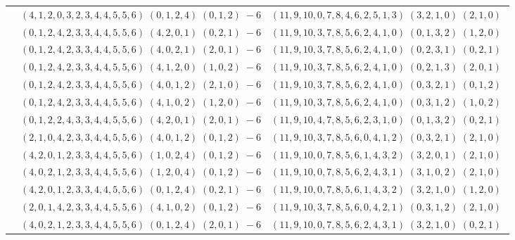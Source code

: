 \documentclass[11pt]{article}
\begin{document}
\begin{longtable}[l]{|c|c|c|}
 \cline{2-3} 
 & $(4 ,1 ,2 ,0 ,3 ,2 ,3 ,4 ,4 ,5 ,5 ,6) \;(0 ,1 ,2 ,4) \;(0 ,1 ,2) \;-6$ & $(11 ,9 ,10 ,0 ,7 ,8 ,4 ,6 ,2 ,5 ,1 ,3) \;(3 ,2 ,1 ,0) \;(2 ,1 ,0) \;$\\ 
 \cline{2-3} 
 & $(0 ,1 ,2 ,4 ,2 ,3 ,3 ,4 ,4 ,5 ,5 ,6) \;(4 ,2 ,0 ,1) \;(0 ,2 ,1) \;-6$ & $(11 ,9 ,10 ,3 ,7 ,8 ,5 ,6 ,2 ,4 ,1 ,0) \;(0 ,1 ,3 ,2) \;(1 ,2 ,0) \;$\\ 
 \cline{2-3} 
 & $(0 ,1 ,2 ,4 ,2 ,3 ,3 ,4 ,4 ,5 ,5 ,6) \;(4 ,0 ,2 ,1) \;(2 ,0 ,1) \;-6$ & $(11 ,9 ,10 ,3 ,7 ,8 ,5 ,6 ,2 ,4 ,1 ,0) \;(0 ,2 ,3 ,1) \;(0 ,2 ,1) \;$\\ 
 \cline{2-3} 
 & $(0 ,1 ,2 ,4 ,2 ,3 ,3 ,4 ,4 ,5 ,5 ,6) \;(4 ,1 ,2 ,0) \;(1 ,0 ,2) \;-6$ & $(11 ,9 ,10 ,3 ,7 ,8 ,5 ,6 ,2 ,4 ,1 ,0) \;(0 ,2 ,1 ,3) \;(2 ,0 ,1) \;$\\ 
 \cline{2-3} 
 & $(0 ,1 ,2 ,4 ,2 ,3 ,3 ,4 ,4 ,5 ,5 ,6) \;(4 ,0 ,1 ,2) \;(2 ,1 ,0) \;-6$ & $(11 ,9 ,10 ,3 ,7 ,8 ,5 ,6 ,2 ,4 ,1 ,0) \;(0 ,3 ,2 ,1) \;(0 ,1 ,2) \;$\\ 
 \cline{2-3} 
 & $(0 ,1 ,2 ,4 ,2 ,3 ,3 ,4 ,4 ,5 ,5 ,6) \;(4 ,1 ,0 ,2) \;(1 ,2 ,0) \;-6$ & $(11 ,9 ,10 ,3 ,7 ,8 ,5 ,6 ,2 ,4 ,1 ,0) \;(0 ,3 ,1 ,2) \;(1 ,0 ,2) \;$\\ 
 \cline{2-3} 
 & $(0 ,1 ,2 ,2 ,4 ,3 ,3 ,4 ,4 ,5 ,5 ,6) \;(4 ,2 ,0 ,1) \;(2 ,0 ,1) \;-6$ & $(11 ,9 ,10 ,4 ,7 ,8 ,5 ,6 ,2 ,3 ,1 ,0) \;(0 ,1 ,3 ,2) \;(0 ,2 ,1) \;$\\ 
 \cline{2-3} 
 & $(2 ,1 ,0 ,4 ,2 ,3 ,3 ,4 ,4 ,5 ,5 ,6) \;(4 ,0 ,1 ,2) \;(0 ,1 ,2) \;-6$ & $(11 ,9 ,10 ,3 ,7 ,8 ,5 ,6 ,0 ,4 ,1 ,2) \;(0 ,3 ,2 ,1) \;(2 ,1 ,0) \;$\\ 
 \cline{2-3} 
 & $(4 ,2 ,0 ,1 ,2 ,3 ,3 ,4 ,4 ,5 ,5 ,6) \;(1 ,0 ,2 ,4) \;(0 ,1 ,2) \;-6$ & $(11 ,9 ,10 ,0 ,7 ,8 ,5 ,6 ,1 ,4 ,3 ,2) \;(3 ,2 ,0 ,1) \;(2 ,1 ,0) \;$\\ 
 \cline{2-3} 
 & $(4 ,0 ,2 ,1 ,2 ,3 ,3 ,4 ,4 ,5 ,5 ,6) \;(1 ,2 ,0 ,4) \;(0 ,1 ,2) \;-6$ & $(11 ,9 ,10 ,0 ,7 ,8 ,5 ,6 ,2 ,4 ,3 ,1) \;(3 ,1 ,0 ,2) \;(2 ,1 ,0) \;$\\ 
 \cline{2-3} 
 & $(4 ,2 ,0 ,1 ,2 ,3 ,3 ,4 ,4 ,5 ,5 ,6) \;(0 ,1 ,2 ,4) \;(0 ,2 ,1) \;-6$ & $(11 ,9 ,10 ,0 ,7 ,8 ,5 ,6 ,1 ,4 ,3 ,2) \;(3 ,2 ,1 ,0) \;(1 ,2 ,0) \;$\\ 
 \cline{2-3} 
 & $(2 ,0 ,1 ,4 ,2 ,3 ,3 ,4 ,4 ,5 ,5 ,6) \;(4 ,1 ,0 ,2) \;(0 ,1 ,2) \;-6$ & $(11 ,9 ,10 ,3 ,7 ,8 ,5 ,6 ,0 ,4 ,2 ,1) \;(0 ,3 ,1 ,2) \;(2 ,1 ,0) \;$\\ 
 \cline{2-3} 
 & $(4 ,0 ,2 ,1 ,2 ,3 ,3 ,4 ,4 ,5 ,5 ,6) \;(0 ,1 ,2 ,4) \;(2 ,0 ,1) \;-6$ & $(11 ,9 ,10 ,0 ,7 ,8 ,5 ,6 ,2 ,4 ,3 ,1) \;(3 ,2 ,1 ,0) \;(0 ,2 ,1) \;$\\ 

\end{longtable}
\end{document}
